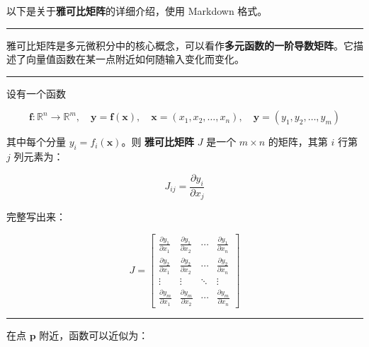 以下是关于\textbf{雅可比矩阵}的详细介绍，使用 Markdown 格式。

\begin{center}\rule{0.5\linewidth}{0.5pt}\end{center}

\label{ux96c5ux53efux6bd4ux77e9ux9635jacobian-matrix}

雅可比矩阵是多元微积分中的核心概念，可以看作\textbf{多元函数的一阶导数矩阵}。它描述了向量值函数在某一点附近如何随输入变化而变化。

\begin{center}\rule{0.5\linewidth}{0.5pt}\end{center}

\label{ux5b9aux4e49}

设有一个函数

\[
\mathbf{f}: \mathbb{R}^n \to \mathbb{R}^m, \quad
\mathbf{y} = \mathbf{f}(\mathbf{x}), \quad
\mathbf{x} = (x_1, x_2, \dots, x_n),\quad
\mathbf{y} = (y_1, y_2, \dots, y_m)
\]

其中每个分量 \(y_i = f_i(\mathbf{x})\)。则 \textbf{雅可比矩阵} \(J\)
是一个 \(m \times n\) 的矩阵，其第 \(i\) 行第 \(j\) 列元素为：

\[
J_{ij} = \frac{\partial y_i}{\partial x_j}
\]

完整写出来：

\[
J = \begin{bmatrix}
\frac{\partial y_1}{\partial x_1} & \frac{\partial y_1}{\partial x_2} & \cdots & \frac{\partial y_1}{\partial x_n} \\
\frac{\partial y_2}{\partial x_1} & \frac{\partial y_2}{\partial x_2} & \cdots & \frac{\partial y_2}{\partial x_n} \\
\vdots & \vdots & \ddots & \vdots \\
\frac{\partial y_m}{\partial x_1} & \frac{\partial y_m}{\partial x_2} & \cdots & \frac{\partial y_m}{\partial x_n}
\end{bmatrix}
\]

\begin{center}\rule{0.5\linewidth}{0.5pt}\end{center}

\label{ux51e0ux4f55ux4e0eux7269ux7406ux610fux4e49}

\label{ux5c40ux90e8ux7ebfux6027ux8fd1ux4f3c}

在点 \(\mathbf{p}\) 附近，函数可以近似为：

